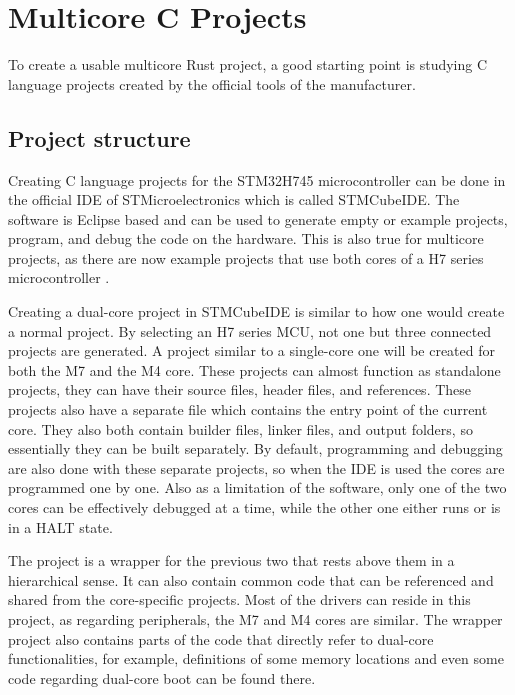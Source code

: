 \chapter{Multicore C Projects}

To create a usable multicore Rust project, a good starting point is studying C language projects created by the official tools of the manufacturer.

\section{Project structure}

Creating C language projects for the STM32H745 microcontroller can be done in the official IDE of STMicroelectronics which is called STMCubeIDE. The software is Eclipse based and can be used to generate empty or example projects, program, and debug the code on the hardware. This is also true for multicore projects, as there are now example projects that use both cores of a H7 series microcontroller \cite{CExamples}.

Creating a dual-core project in STMCubeIDE is similar to how one would create a normal project. By selecting an H7 series MCU, not one but three connected projects are generated. A project similar to a single-core one will be created for both the M7 and the M4 core. These projects can almost function as standalone projects, they can have their source files, header files, and references. These projects also have a separate  file which contains the entry point of the current core. They also both contain builder files, linker files, and output folders, so essentially they can be built separately. By default, programming and debugging are also done with these separate projects, so when the IDE is used the cores are programmed one by one. Also as a limitation of the software, only one of the two cores can be effectively debugged at a time, while the other one either runs or is in a HALT state.

The project is a wrapper for the previous two that rests above them in a hierarchical sense. It can also contain common code that can be referenced and shared from the core-specific projects. Most of the drivers can reside in this project, as regarding peripherals, the M7 and M4 cores are similar. The wrapper project also contains parts of the code that directly refer to dual-core functionalities, for example, definitions of some memory locations and even some code regarding dual-core boot can be found there.

